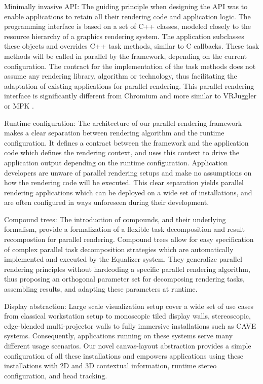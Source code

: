 \begin{compactdesc}

\item[Minimally invasive API:] The guiding principle when designing the API was
to enable applications to retain all their rendering code and application logic.
The programming interface is based on a set of C++ classes, modeled closely to
the resource hierarchy of a graphics rendering system. The application
subclasses these objects and overrides C++ task methods, similar to C callbacks.
These task methods will be called in parallel by the framework, depending on the
current configuration. The contract for the  implementation of the task methods
does not assume any rendering library, algorithm or technology, thus
facilitating the adaptation of existing applications for parallel rendering.
This parallel rendering interface is significantly different from Chromium
\cite{HHNFAKK:02} and more similar to VRJuggler \cite{BJHMBC:01} or MPK
\cite{BRE:05}.

\item[Runtime configuration:] The architecture of our parallel rendering
framework makes a clear separation between rendering algorithm and the runtime
configuration. It defines a contract between the framework and the application
code which defines the rendering context, and uses this context to drive the
application output depending on the runtime configuration. Application
developers are unware of parallel rendering setups and make no assumptions on
how the rendering code will be executed. This clear separation yields parallel
rendering applications which can be deployed on a wide set of installations, and
are often configured in ways unforeseen during their development.

\item[Compound trees:] The introduction of compounds, and their underlying
formalism, provide a formalization of a flexible task decomposition and result
recompostion for parallel rendering. Compound trees allow for easy specification
of complex parallel task decomposition strategies which are automatically
implemented and executed by the Equalizer system. They generalize parallel
rendering principles without hardcoding a specific parallel rendering algorithm,
thus proposing an orthogonal parameter set for decomposing rendering tasks,
assembling results, and adapting these parameters at runtime.

\item[Display abstraction:] Large scale visualization setup cover a wide set of
use cases from classical workstation setup to monoscopic tiled display walls,
stereoscopic, edge-blended multi-projector walls to fully immersive
installations such as CAVE systems. Consequently, applications running on these
systems serve many different usage scenarios. Our novel canvas-layout
abstraction provides a simple configuration of all these installations and
empowers applications using these installations with 2D and 3D contextual
information, runtime stereo configuration, and head tracking.


\end{compactdesc}
